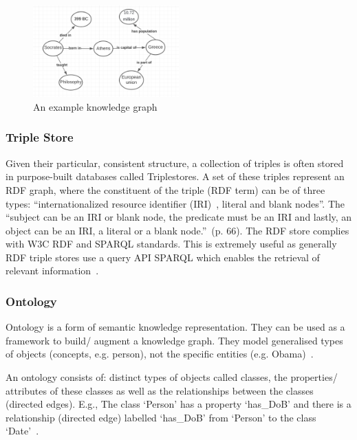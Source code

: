 \begin{figure}[H]
    \centering
    \includegraphics[width=0.5\textwidth]{images/eg_kg.png}
    \caption{An example knowledge graph}
    \label{example_kg}
\end{figure}

\subsubsection{Triple Store}

Given their particular, consistent structure, a collection of triples is often stored in purpose-built databases called Triplestores. A set of these triples represent an RDF graph, where the constituent of the triple (RDF term) can be of three types: ``internationalized resource identifier (IRI)~\cite{internationalized}, literal and blank nodes''. The ``subject can be an IRI or blank node, the predicate must be an IRI and lastly, an object can be an IRI, a literal or a blank node.''~\cite{6_world2014rdf}(p. 66). The RDF store complies with  W3C RDF and SPARQL standards. This is extremely useful as generally RDF triple stores use a query API SPARQL which enables the retrieval of relevant information~\cite{8_berven2020knowledge}.

\subsubsection{Ontology}

Ontology is a form of semantic knowledge representation. They can be used as a framework to build/ augment a knowledge graph. They model generalised types of objects (concepts, e.g. person), not the specific entities (e.g. Obama)~\cite{4_towards_kg}.

An ontology consists of: distinct types of objects called classes, the properties/ attributes of these classes as well as the relationships between the classes (directed edges). E.g., The class `Person' has a property `has\_DoB' and there is a relationship (directed edge) labelled `has\_DoB' from `Person' to the class `Date'~\cite{4_towards_kg}.

